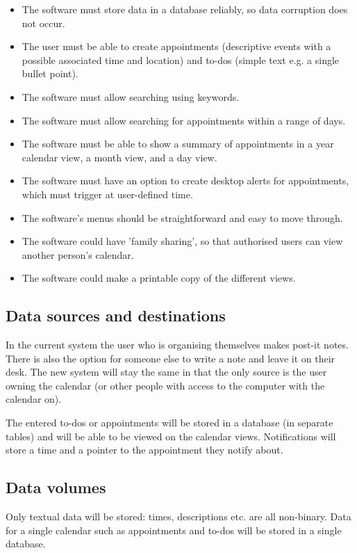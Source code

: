 \begin{itemize}
  \item The software must store data in a database reliably, so data corruption
      does not occur.
  \item The user must be able to create appointments (descriptive events with a
      possible associated time and location) and to-dos (simple text e.g. a
      single bullet point).
  \item The software must allow searching using keywords.
  \item The software must allow searching for appointments within a range of
      days.
  \item The software must be able to show a summary of appointments in a year
      calendar view, a month view, and a day view.
  \item The software must have an option to create desktop alerts for
      appointments, which must trigger at user-defined time.
  \item The software's menus should be straightforward and easy to move through.
  \item The software could have 'family sharing', so that authorised users can
      view another person's calendar.
  \item The software could make a printable copy of the different views.
  \end{itemize}


\subsection{Data sources and destinations}

In the current system the user who is organising themselves makes post-it notes.
There is also the option for someone else to write a note and leave it on their
desk. The new system will stay the same in that the only source is the user
owning the calendar (or other people with access to the computer with the
calendar on).

The entered to-dos or appointments will be stored in a database (in separate
tables) and will be able to be viewed on the calendar views. Notifications will
store a time and a pointer to the appointment they notify about.


\subsection{Data volumes}

Only textual data will be stored: times, descriptions etc. are all
non-binary. Data for a single calendar such as appointments and to-dos will be
stored in a single database.

